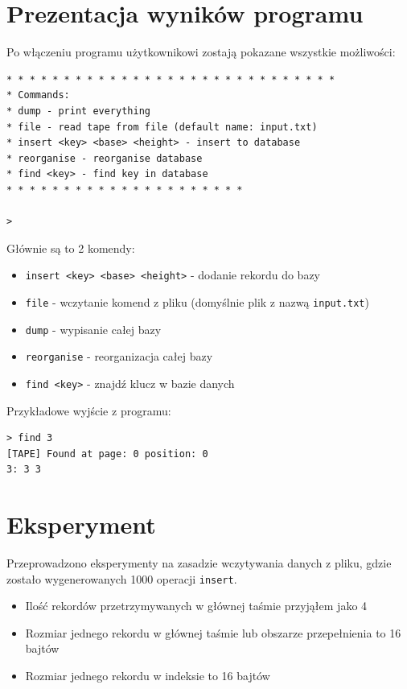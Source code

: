 \documentclass[
]{article}
\providecommand{\tightlist}{%
  \setlength{\itemsep}{0pt}\setlength{\parskip}{0pt}}
\begin{document}
\section{Prezentacja wyników
programu}\label{prezentacja-wynikuxf3w-programu}

Po włączeniu programu użytkownikowi zostają pokazane wszystkie
możliwości:

\begin{verbatim}
* * * * * * * * * * * * * * * * * * * * * * * * * * * * *
* Commands:
* dump - print everything 
* file - read tape from file (default name: input.txt)
* insert <key> <base> <height> - insert to database 
* reorganise - reorganise database
* find <key> - find key in database
* * * * * * * * * * * * * * * * * * * * *

>  
\end{verbatim}

Głównie są to 2 komendy:

\begin{itemize}
\tightlist
\item
  \texttt{insert\ \textless{}key\textgreater{}\ \textless{}base\textgreater{}\ \textless{}height\textgreater{}}
  - dodanie rekordu do bazy
\item
  \texttt{file} - wczytanie komend z pliku (domyślnie plik z nazwą
  \texttt{input.txt})
\item
  \texttt{dump} - wypisanie całej bazy
\item
  \texttt{reorganise} - reorganizacja całej bazy
\item
  \texttt{find\ \textless{}key\textgreater{}} - znajdź klucz w bazie
  danych
\end{itemize}

Przykładowe wyjście z programu:

\begin{verbatim}
> find 3
[TAPE] Found at page: 0 position: 0
3: 3 3  
\end{verbatim}

\section{Eksperyment}\label{eksperyment}

Przeprowadzono eksperymenty na zasadzie wczytywania danych z pliku,
gdzie zostało wygenerowanych 1000 operacji \texttt{insert}.

\begin{itemize}
\tightlist
\item
  Ilość rekordów przetrzymywanych w głównej taśmie przyjąłem jako 4
\item
  Rozmiar jednego rekordu w głównej taśmie lub obszarze przepełnienia to
  16 bajtów
\item
  Rozmiar jednego rekordu w indeksie to 16 bajtów
\end{itemize}
\end{document}

